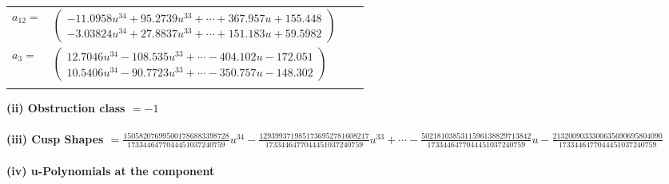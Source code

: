 \documentclass[1p]{elsarticle_modified}
\theoremstyle{definition}
\begin{document}
\begin{tabular}{m{7pt} m{180pt} m{7pt} m{180pt} }
\flushright $a_{12}=$&$\begin{pmatrix}-11.0958 u^{34}+95.2739 u^{33}+\cdots+367.957 u+155.448\\-3.03824 u^{34}+27.8837 u^{33}+\cdots+151.183 u+59.5982\end{pmatrix}$ \\
\flushright $a_{3}=$&$\begin{pmatrix}12.7046 u^{34}-108.535 u^{33}+\cdots-404.102 u-172.051\\10.5406 u^{34}-90.7723 u^{33}+\cdots-350.757 u-148.302\end{pmatrix}$\\&\end{tabular}
\flushleft \textbf{(ii) Obstruction class $= -1$}\\~\\
\flushleft \textbf{(iii) Cusp Shapes $= \frac{150582076995001786883398728}{1733446477044451037240759} u^{34}-\frac{1293993719851736952781608217}{1733446477044451037240759} u^{33}+\cdots-\frac{5021810385311596138829713842}{1733446477044451037240759} u-\frac{2132009033300635690695804090}{1733446477044451037240759}$}\\~\\
\newpage\renewcommand{\arraystretch}{1}
\flushleft \textbf{(iv) u-Polynomials at the component}\newline \\
\end{document}
